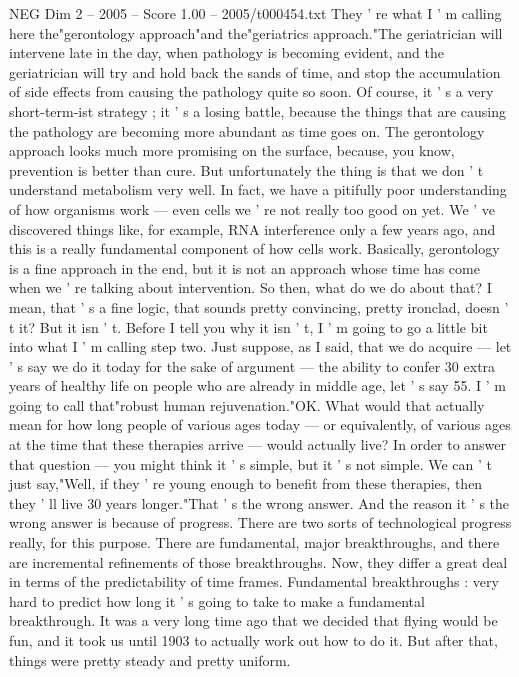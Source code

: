 \begin{textsample}{NEG Dim 2 – 2005 – Score 1.00 – 2005/t000454.txt}
They ' re what I ' m calling here the"gerontology approach"and the"geriatrics approach."The geriatrician will intervene late in the day, when pathology is becoming evident, and the geriatrician will try and hold back the sands of time, and stop the accumulation of side effects from causing the pathology quite so soon.
Of course, it ' s a very short-term-ist strategy ; it ' s a losing battle, because the things that are causing the pathology are becoming more abundant as time goes on.
The gerontology approach looks much more promising on the surface, because, you know, prevention is better than cure.
But unfortunately the thing is that we don ' t understand metabolism very well.
In fact, we have a pitifully poor understanding of how organisms work — even cells we ' re not really too good on yet.
We ' ve discovered things like, for example, RNA interference only a few years ago, and this is a really fundamental component of how cells work.
Basically, gerontology is a fine approach in the end, but it is not an approach whose time has come when we ' re talking about intervention.
So then, what do we do about that?
I mean, that ' s a fine logic, that sounds pretty convincing, pretty ironclad, doesn ' t it?
But it isn ' t.
Before I tell you why it isn ' t, I ' m going to go a little bit into what I ' m calling step two.
Just suppose, as I said, that we do acquire — let ' s say we do it today for the sake of argument — the ability to confer 30 extra years of healthy life on people who are already in middle age, let ' s say 55.
I ' m going to call that"robust human rejuvenation."OK.
What would that actually mean for how long people of various ages today — or equivalently, of various ages at the time that these therapies arrive — would actually live?
In order to answer that question — you might think it ' s simple, but it ' s not simple.
We can ' t just say,"Well, if they ' re young enough to benefit from these therapies, then they ' ll live 30 years longer."That ' s the wrong answer.
And the reason it ' s the wrong answer is because of progress.
There are two sorts of technological progress really, for this purpose.
There are fundamental, major breakthroughs, and there are incremental refinements of those breakthroughs.
Now, they differ a great deal in terms of the predictability of time frames.
Fundamental breakthroughs : very hard to predict how long it ' s going to take to make a fundamental breakthrough.
It was a very long time ago that we decided that flying would be fun, and it took us until 1903 to actually work out how to do it.
But after that, things were pretty steady and pretty uniform.

\end{textsample}
